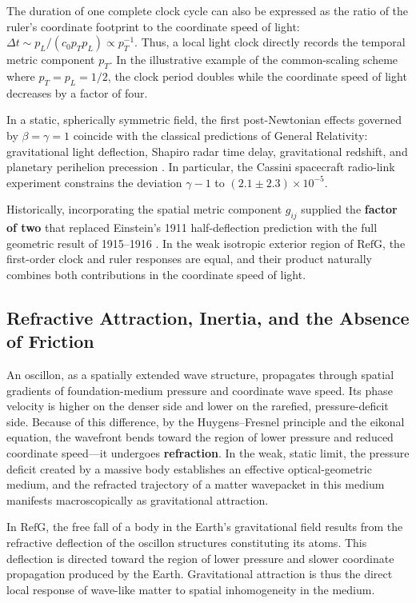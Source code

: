 \documentclass[11pt,a4paper]{article}
\newcommand{\RefG}{\mathrm{RefG}}
\begin{document}
The duration of one complete clock cycle can also be expressed as the ratio of the ruler's coordinate footprint to the coordinate speed of light: $\Delta t\sim p_L/(c_0p_Tp_L)\propto p_T^{-1}$. Thus, a local light clock directly records the temporal metric component $p_T$. In the illustrative example of the common-scaling scheme where $p_T=p_L=1/2$, the clock period doubles while the coordinate speed of light decreases by a factor of four.

In a static, spherically symmetric field, the first post-Newtonian effects governed by $\beta=\gamma=1$ coincide with the classical predictions of General Relativity: gravitational light deflection, Shapiro radar time delay, gravitational redshift, and planetary perihelion precession \citep{bertotti2003,will2014}. In particular, the Cassini spacecraft radio-link experiment constrains the deviation $\gamma-1$ to $(2.1\pm2.3)\times10^{-5}$.

Historically, incorporating the spatial metric component $g_{ij}$ supplied the \textbf{factor of two} that replaced Einstein's 1911 half-deflection prediction with the full geometric result of 1915--1916 \citep{einstein1916,shapiro1964}. In the weak isotropic exterior region of $\RefG$, the first-order clock and ruler responses are equal, and their product naturally combines both contributions in the coordinate speed of light.

\subsection{Refractive Attraction, Inertia, and the Absence of Friction}

An oscillon, as a spatially extended wave structure, propagates through spatial gradients of foundation-medium pressure and coordinate wave speed. Its phase velocity is higher on the denser side and lower on the rarefied, pressure-deficit side. Because of this difference, by the Huygens--Fresnel principle and the eikonal equation, the wavefront bends toward the region of lower pressure and reduced coordinate speed---it undergoes \textbf{refraction}. In the weak, static limit, the pressure deficit created by a massive body establishes an effective optical-geometric medium, and the refracted trajectory of a matter wavepacket in this medium manifests macroscopically as gravitational attraction.

In $\RefG$, the free fall of a body in the Earth's gravitational field results from the refractive deflection of the oscillon structures constituting its atoms. This deflection is directed toward the region of lower pressure and slower coordinate propagation produced by the Earth. Gravitational attraction is thus the direct local response of wave-like matter to spatial inhomogeneity in the medium.
\end{document}
